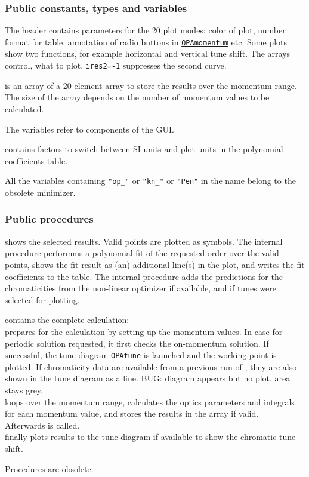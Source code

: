 \documentclass[12pt]{article}
\newcommand\code[1]{{\tt #1}}
\newcommand\guico[1]{{\color{blue}\code{#1}}}
\newcommand{\unico}[1]{{\color{burntorange}\code{#1}}}
\newcommand{\opagui}[1]{\colorbox{blue!20}{\code{#1}}}
\newcommand{\ogui}[1]{\hyperref[#1]{\opagui{#1}}}
\newcommand{\pvar}[1]{\subsubsection*{Public constants, types and variables} #1}
\newcommand{\ppro}[1]{\subsubsection*{Public procedures} #1}
\newcommand{\todo}[1]{{\color{red} #1}}
\begin{document}
\pvar{
The header contains parameters for the 20 plot modes: color of plot, number format for table, annotation of radio buttons in \ogui{OPAmomentum} etc. Some plots show two functions, for example horizontal and vertical tune shift. The arrays \unico{ires1,2} control, what to plot. \code{ires2=-1} suppresses the second curve.

\unico{result} is an array of a 20-element array to store the results over the momentum range. The size of the array depends on the number of momentum values to be calculated.

The \unico{...\_HANDLE} variables refer to components of the \guico{OPAmomentum} GUI.

\unico{res\_funit} contains factors to switch between SI-units and plot units in the polynomial coefficients table.


\todo{All the variables containing \code{"op\_"} or \code{"kn\_"} or \code{"Pen"} in the name belong to the obsolete minimizer.}
}

\ppro{
\unico{Makeplot} shows the selected results. Valid points are plotted as symbols. The internal procedure \unico{fit\_and\_plot} performms a polynomial fit of the requested order over the valid points, shows the fit result as (an) additional line(s) in the plot, and writes the fit coefficients to the table. The internal procedure \unico{plot\_qclines} adds the predictions for the chromaticities from the non-linear optimizer \guico{OPAChroma} if available, and if tunes were selected for plotting.

\unico{FullCalc} contains the complete calculation:\\
\unico{PreCalc} prepares for the calculation by setting up the momentum values. In case for periodic solution requested, it first checks the on-momentum solution. If successful, the tune diagram \ogui{OPAtune} is launched and the working point is plotted. If chromaticity data are available from a previous run of \guico{OPAChroma}, they are also shown in the tune diagram as a line. \todo{BUG: diagram appears but no plot, area  stays grey.}\\
\unico{Calculate} loops over the momentum range, calculates the optics parameters and integrals for each momentum value, and stores the results in the \unico{result} array if valid.\\
Afterwards \unico{MakePLot} is called.\\
\unico{PostCalc} finally plots results to the tune diagram if available to show the chromatic tune shift.

\todo{Procedures \unico{CalcPenalty, ShowPenalty, CalcTarg} are obsolete.}

}
\end{document}

